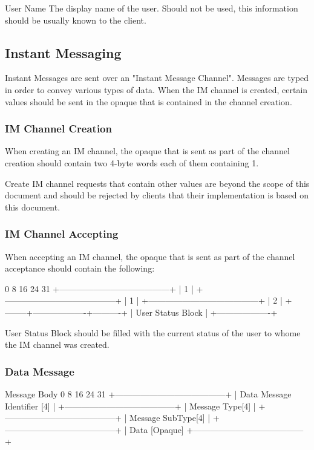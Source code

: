 \documentclass[titlepage,oneside]{book}
\begin{document}
User Name
  The display name of the user. Should not be used, this information
  should be usually known to the client.

\subsection{Instant Messaging}

Instant Messages are sent over an "Instant Message Channel". Messages
are typed in order to convey various types of data. When the IM channel
is created, certain values should be sent in the opaque that is
contained in the channel creation.

\subsubsection{IM Channel Creation}

When creating an IM channel, the opaque that is sent as part of the 
channel creation should contain two 4-byte words each of them 
containing 1.

Create IM channel requests that contain other values are beyond the
scope of this document and should be rejected by clients that their
implementation is based on this document.

\subsubsection{IM Channel Accepting}

When accepting an IM channel, the opaque that is sent as part of the
channel acceptance should contain the following:

0         8         16        24      31
+---------------------------------------+
|                  1                    |
+---------------------------------------+
|                  1                    |
+---------------------------------------+
|                  2                    |
+--------+-------------------+----------+
         | User Status Block |
         +-------------------+

User Status Block should be filled with the current status of the user
to whome the IM channel was created.

\subsubsection{Data Message}

Message Body
0         8         16        24      31
+---------------------------------------+
|       Data Message Identifier [4]     |
+---------------------------------------+
|            Message Type[4]            |
+---------------------------------------+
|          Message SubType[4]           |
+---------------------------------------+
|             Data [Opaque]
+---------------------------------------+
\end{document}
